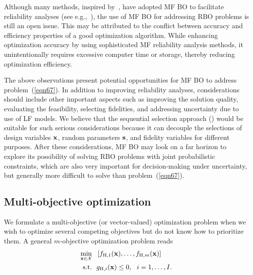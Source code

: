 \documentclass[iicol,sn-basic]{sn-jnl}%
\begin{document}
Although many methods, inspired by~\cite{Bichon2008}, have adopted MF BO to facilitate reliability analyses (see e.g.,~\cite{Chaudhuri2021,Patsialis2021,ZhangC2022,AshwinRenganathan2023}), the use of MF BO for addressing RBO problems is still an open issue.
This may be attributed to the conflict between accuracy and efficiency properties of a good optimization algorithm.
While enhancing optimization accuracy by using sophisticated MF reliability analysis methods, it unintentionally requires excessive computer time or storage, thereby reducing optimization efficiency.    

The above observations present potential opportunities for MF BO to address problem~(\ref{eqn67}).
In addition to improving reliability analyses, considerations should include other important aspects such as improving the solution quality, evaluating the feasibility, selecting fidelities, and addressing uncertainty due to use of LF models.
We believe that the sequential selection approach () would be suitable for such serious considerations because it can decouple the selections of design variables $\bf x$, random parameters $\bf s$, and fidelity variables for different purposes.   
After these considerations, MF BO may look on a far horizon to explore its possibility of solving RBO problems with joint probabilistic constraints, which are also very important for decision-making under uncertainty, but generally more difficult to solve than problem~(\ref{eqn67}).

\subsection{Multi-objective optimization}\label{Sec64}

We formulate a multi-objective (or vector-valued) optimization problem when we wish to optimize several competing objectives but do not know how to prioritize them.
A general $m$-objective optimization problem reads
\begin{equation}\label{eqn68}
	\begin{aligned}
		\underset{{\bf x} \in \mathcal{X}}{\min} \ \ & \left[f_{\text{H},1}({\bf x}),\dots,f_{\text{H},m}({\bf x})\right]\\
		\textrm{s.t.} \ \ 
		& g_{\text{H},i}({\bf x}) \leq 0,\ \ i=1,\dots,I. 
	\end{aligned}
\end{equation}
\end{document}
